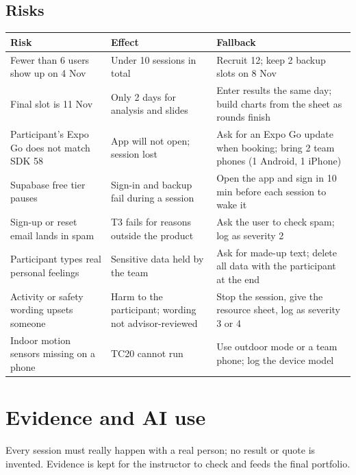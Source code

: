 \documentclass{article}
\begin{document}
\subsection{Risks}

\begin{center}
\small
\begin{tabularx}{\linewidth}{|L{4.5cm}|L{4.1cm}|Y|}
\hline
\textbf{Risk} & \textbf{Effect} & \textbf{Fallback} \\ \hline
Fewer than 6 users show up on 4 Nov & Under 10 sessions in total & Recruit 12; keep 2 backup slots on 8 Nov \\ \hline
Final slot is 11 Nov & Only 2 days for analysis and slides & Enter results the same day; build charts from the sheet as rounds finish \\ \hline
Participant's Expo Go does not match SDK 58 & App will not open; session lost & Ask for an Expo Go update when booking; bring 2 team phones (1 Android, 1 iPhone) \\ \hline
Supabase free tier pauses & Sign-in and backup fail during a session & Open the app and sign in 10 min before each session to wake it \\ \hline
Sign-up or reset email lands in spam & T3 fails for reasons outside the product & Ask the user to check spam; log as severity 2 \\ \hline
Participant types real personal feelings & Sensitive data held by the team & Ask for made-up text; delete all data with the participant at the end \\ \hline
Activity or safety wording upsets someone & Harm to the participant; wording not advisor-reviewed & Stop the session, give the resource sheet, log as severity 3 or 4 \\ \hline
Indoor motion sensors missing on a phone & TC20 cannot run & Use outdoor mode or a team phone; log the device model \\ \hline
\end{tabularx}
\end{center}

\section{Evidence and AI use}

Every session must really happen with a real person; no result or quote is invented. Evidence is kept for the instructor to check and feeds the final portfolio.
\end{document}
